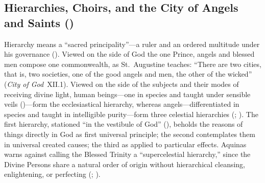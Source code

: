
\subsection{Hierarchies, Choirs, and the City of Angels and Saints ()}

Hierarchy means a ``sacred principality''---a ruler and an ordered multitude under his governance (). Viewed on the side of God the one Prince, angels and blessed men compose one commonwealth, as St.~Augustine teaches: ``There are two cities, that is, two societies, one of the good angels and men, the other of the wicked'' (\emph{City of God}~XII.1). Viewed on the side of the subjects and their modes of receiving divine light, human beings---one in species and taught under sensible veils ()---form the ecclesiastical hierarchy, whereas angels---differentiated in species and taught in intelligible purity---form three celestial hierarchies (; ). The first hierarchy, stationed ``in the vestibule of God'' (), beholds the reasons of things directly in God as first universal principle; the second contemplates them in universal created causes; the third as applied to particular effects. Aquinas warns against calling the Blessed Trinity a ``supercelestial hierarchy,'' since the Divine Persons share a natural order of origin without hierarchical cleansing, enlightening, or perfecting (; ).

